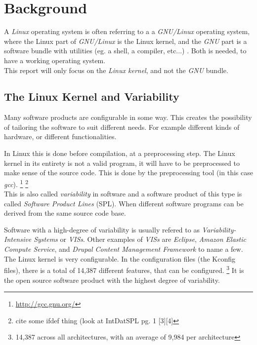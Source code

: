 \documentclass[a4paper,11pt]{report}
\begin{document}
        \chapter{Background}

A \emph{Linux} operating system is often referring to a a \emph{GNU/Linux} 
operating system, where the Linux part of \emph{GNU/Linux} is the Linux kernel, 
and the \emph{GNU} part is a software bundle with utilities (eg. a shell, a 
compiler, etc...) \cite{gnupack}. Both is 
needed, to have a working operating system. 
\\

This report will only focus on the \emph{Linux kernel}, and not the \emph{GNU} 
bundle.


        \section{The Linux Kernel and Variability}

Many software products are configurable in some way. This creates the 
possibility of tailoring the software to suit different needs. For example 
different kinds of hardware, or different functionalities. 

In Linux this is done before compilation, at a preprocessing step. The Linux 
kernel in its entirety is not a valid program, it will have to be preprocessed 
to make sense of the source code.
This is done by the preprocessing tool (in this case \emph{gcc}).
    \cite[p. 1]{IntDatSPL}
    \footnote{\url{http://gcc.gnu.org/}}
    \footnote{cite some ifdef thing (look at IntDatSPL pg. 1 [3][4]}
\\

This is also called \emph{variability} in software and a software product of 
this type is called \emph{Software Product Lines} (SPL). When different 
software programs can be derived from the same source code base. 

Software with a high-degree of variability is usually refered to as 
\emph{Variability-Intensive Systems} or \emph{VISs}. Other examples of 
\emph{VISs} are \emph{Eclipse}, \emph{Amazon Elastic Compute Service}, and 
\emph{Drupal Content Management Framework} 
    \cite[p. 1]{VarTesDrupal}
to name a few.
\\

The Linux kernel is very configurable. In the configuration files (the Kconfig 
files), there is a total of 14,387 different features, that can be configured.
    \footnote {14,387 across all architectures, with an average of 9,984 per 
        architecture}
It is the open source software product with the highest degree of variability.
\end{document}

